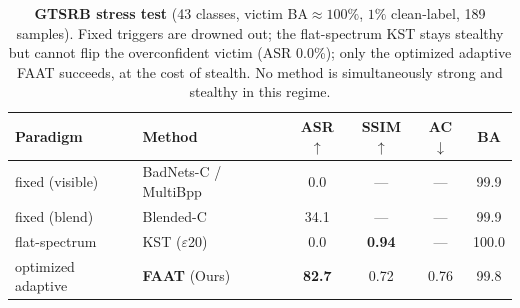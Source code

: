 \begin{table}[t]
\centering
\small
\setlength{\tabcolsep}{4pt}
\begin{tabular}{l l c c c c}
\toprule
Paradigm & Method & ASR$\uparrow$ & SSIM$\uparrow$ & AC$\downarrow$ & BA \\
\midrule
fixed (visible)   & BadNets-C / MultiBpp & 0.0 & --- & --- & 99.9 \\
fixed (blend)     & Blended-C            & 34.1 & --- & --- & 99.9 \\
flat-spectrum     & KST ($\varepsilon$20) & 0.0 & \textbf{0.94} & --- & 100.0 \\
optimized adaptive& \textbf{FAAT} (Ours) & \textbf{82.7} & 0.72 & 0.76 & 99.8 \\
\bottomrule
\end{tabular}
\caption{\textbf{GTSRB stress test} (43 classes, victim BA$\approx\!100\%$,
$1\%$ clean-label, 189 samples). Fixed triggers are drowned out; the
flat-spectrum KST stays stealthy but cannot flip the overconfident victim
(ASR $0.0$\%); only the optimized adaptive FAAT succeeds, at the cost of
stealth. No method is simultaneously strong and stealthy in this regime.}
\label{tab:gtsrb}
\end{table}
